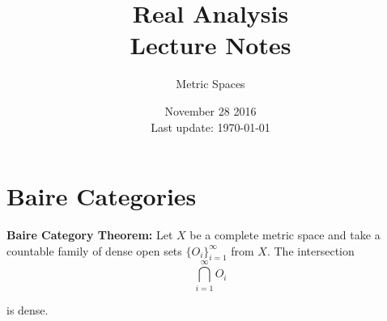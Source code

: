 \documentclass[12pt]{article}
\begin{document}
 
 
\title{Real Analysis\\Lecture Notes}
\author{Metric Spaces}
\date{November 28 2016 \\ Last update: \today{}}
\maketitle

\section{Baire Categories}

%
%
{\bf Baire Category Theorem:} Let $X$ be a complete metric space and take a countable family of dense open sets $\{O_i\}^\infty_{i = 1}$ from $X$. The intersection
\begin{equation*}
	\bigcap^\infty_{i = 1} O_i
\end{equation*}

is dense. 
\end{document}
